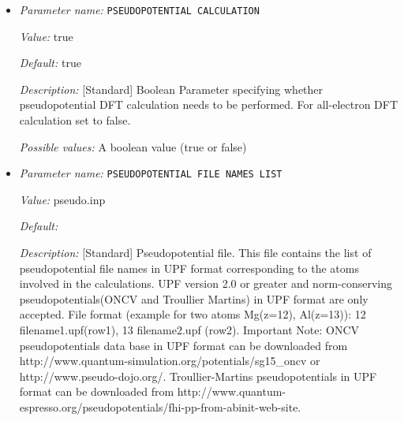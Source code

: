 \begin{itemize}
{\it Description:} [Standard] Net charge of the system in atomic units, positive quantity implies addition of electrons. In case of non-periodic boundary conditions, this capability is implemented using multipole Dirichlet inhomogeneous boundary conditions for the electrostatics. In case of periodic and semi-periodic conditions a uniform background charge is used to create a neutral system.


{\it Possible values:} A floating point number $v$ such that $-\text{MAX\_DOUBLE} \leq v \leq \text{MAX\_DOUBLE}$
\item {\it Parameter name:} {\tt PSEUDOPOTENTIAL CALCULATION}
\label{parameters:DFT functional parameters/PSEUDOPOTENTIAL CALCULATION}
\label{parameters:DFT_20functional_20parameters/PSEUDOPOTENTIAL_20CALCULATION}


{\it Value:} true


{\it Default:} true


{\it Description:} [Standard] Boolean Parameter specifying whether pseudopotential DFT calculation needs to be performed. For all-electron DFT calculation set to false.


{\it Possible values:} A boolean value (true or false)
\item {\it Parameter name:} {\tt PSEUDOPOTENTIAL FILE NAMES LIST}
\label{parameters:DFT functional parameters/PSEUDOPOTENTIAL FILE NAMES LIST}
\label{parameters:DFT_20functional_20parameters/PSEUDOPOTENTIAL_20FILE_20NAMES_20LIST}


{\it Value:} pseudo.inp


{\it Default:} 


{\it Description:} [Standard] Pseudopotential file. This file contains the list of pseudopotential file names in UPF format corresponding to the atoms involved in the calculations. UPF version 2.0 or greater and norm-conserving pseudopotentials(ONCV and Troullier Martins) in UPF format are only accepted. File format (example for two atoms Mg(z=12), Al(z=13)): 12 filename1.upf(row1), 13 filename2.upf (row2). Important Note: ONCV pseudopotentials data base in UPF format can be downloaded from http://www.quantum-simulation.org/potentials/sg15\_oncv or http://www.pseudo-dojo.org/.  Troullier-Martins pseudopotentials in UPF format can be downloaded from http://www.quantum-espresso.org/pseudopotentials/fhi-pp-from-abinit-web-site.



\end{itemize}
